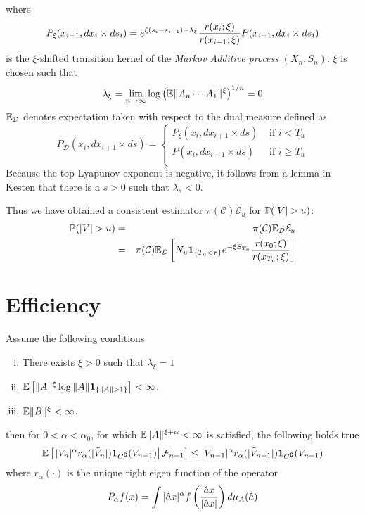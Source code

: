 \documentclass{article}
\begin{document}
where
\[
P_\xi(x_{i-1}, dx_i \times ds_i) = e^{\xi(s_i - s_{i-1}) -
  \lambda_{\xi}} {r(x_i; \xi) \over r(x_{i-1}; \xi)} P(x_{i-1}, dx_i
\times ds_i)
\]
is the $\xi$-shifted transition kernel of the {\it Markov Additive
  process} $(X_n, S_n)$. $\xi$ is chosen such that 
\[
\lambda_{\xi} = \lim_{n \to \infty} \log \left(
\E \|A_n \cdots A_1\|^\xi
\right)^{1/n} = 0
\]
$\E_{\mathcal D}$ denotes expectation taken with respect to the dual
measure defined as
\[
P_{\mathcal D} (x_i, dx_{i+1} \times ds) = \left\{
  \begin{array}{ll}
    P_\xi (x_i, dx_{i+1} \times ds) & \text{ if } i < T_u \\
    P(x_i, dx_{i+1} \times ds) & \text{ if } i \geq T_u \\
  \end{array}
\right.
\]
Because the top Lyapunov exponent is negative, it follows from a lemma
in Kesten \cite{Kesten1973} that there is a $s > 0$ such that
$\lambda_{s} < 0$.

Thus we have obtained a consistent estimator
$\pi(\mathcal C)\mathcal E_u$ for $\P(|V| > u)$:
\begin{eqnarray*}
\P(|V| > u) &=& \pi(\mathcal C) \E_{\mathcal D} \mathcal E_u \\
&=& \pi(\mathcal C) \E_{\mathcal D} \left[
  N_u \1{T_u < \tau} e^{-\xi S_{T_u}} {r(x_0; \xi)
    \over r(x_{T_u}; \xi)}
\right]
\end{eqnarray*}

\section{Efficiency}\label{sec:efficiency}
\begin{lemma}
  Assume the following conditions
  \begin{enumerate}[(i)]
  \item There exists $\xi > 0$ such that $\lambda_{\xi} = 1$
  \item $\E\left[
      \|A\|^{\xi} \log\|A\|\1{\|A\| > 1}
      \right] < \infty$.
  \item $\E \|B\|^{\xi} < \infty$.
  \end{enumerate}
  then for $0 < \alpha < \alpha_0$, for which $\E\|A\|^{\xi + \alpha} <
  \infty$ is satisfied, the following holds true
  \begin{equation}
    \label{eq:drift}
    \E \left[\left.
        |V_n|^\alpha r_{\alpha}(|\tilde V_n|) \I{C^\complement}(V_{n-1}) \right|
      \mathcal F_{n-1} \right] \leq |V_{n-1}|^\alpha r_{\alpha}(|\tilde
    V_{n-1}|) \I{C^\complement}(V_{n-1})
  \end{equation}
  where $r_{\alpha}(\cdot)$ is the unique right eigen function of the
  operator
  \[
  P_{\alpha} f(x) = \int |\hat a x|^\alpha f\left(
    {\hat a x \over |\hat a x|}
  \right) d\mu_A(\hat a)
  \]
\end{lemma}
\end{document}

